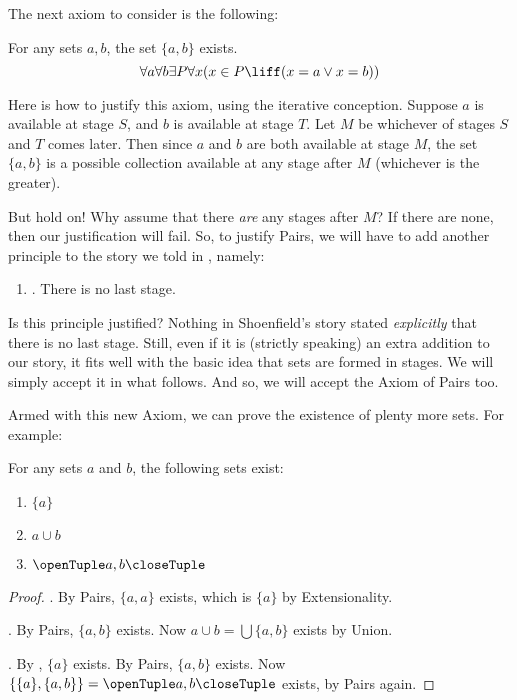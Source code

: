 \documentclass[../../../include/open-logic-section]{subfiles}
\begin{document}

The next axiom to consider is the following:

\begin{axiom}[Pairs]
For any sets $a, b$, the set $\{a, b\}$ exists.
\[
	\forall a \forall b \exists P \forall x (x \in P \liff (x = a \lor x = b))
\]
\end{axiom}

Here is how to justify this axiom, using the iterative conception. Suppose $a$ is available at stage $S$, and $b$ is available at stage $T$. Let $M$ be whichever of stages $S$ and $T$ comes later. Then since $a$ and $b$ are both available at stage $M$, the set $\{a,b\}$ is a possible collection available at any stage after $M$ (whichever is the greater).

But hold on!{} Why assume that there \emph{are} any stages after $M$? If there are none, then our justification will fail. So, to justify Pairs, we will have to add another principle to the story we told in , namely:
\begin{enumerate}
	\item[] \stagessucc. There is no last stage.
\end{enumerate}
Is this principle justified? Nothing in Shoenfield's story stated
\emph{explicitly} that there is no last stage. Still, even if it is
(strictly speaking) an extra addition to our story, it fits well with
the basic idea that sets are formed in stages. We will simply accept
it in what follows. And so, we will accept the Axiom of Pairs too.

Armed with this new Axiom, we can prove the existence of plenty more sets. For example:

\begin{prop}
For any sets $a$ and $b$, the following sets exist:
	\begin{enumerate}
		\item{} $\{a\}$
		\item{} $a \cup b$
		\item{} $\tuple{a, b}$
	\end{enumerate}
\end{prop}

\begin{proof}
. By Pairs, $\{a, a\}$ exists, which is $\{a\}$ by
Extensionality.

. By Pairs, $\{a, b\}$ exists. Now $a \cup b = \bigcup
\{a, b\}$ exists by Union.

. By , $\{a\}$ exists. By Pairs, $\{a,
b\}$ exists. Now $\{\{a\}, \{a, b\}\} = \tuple{a, b}$ exists, by Pairs
again.
\end{proof}
\end{document}
